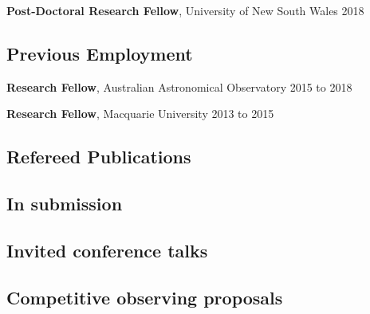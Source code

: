\documentclass[10pt]{article}
\newcommand{\cvlist}{}
\begin{document}
\textbf{Post-Doctoral Research Fellow},
            University of New South Wales
            \hfill {2018}

\vspace{0.1in}

\subsection*{Previous Employment}

\textbf{Research Fellow},
            Australian Astronomical Observatory
            \hfill {2015 to 2018}

\textbf{Research Fellow},
            Macquarie University
            \hfill {2013 to 2015}

\vspace{0.1in}

\subsection*{Refereed Publications}

\begin{list}{}{\cvlist}

\end{list}

\subsection*{In submission}
\begin{list}{}{\cvlist}

\end{list}

\subsection*{Invited conference talks}
\begin{list}{}{\cvlist}

\end{list}

\subsection*{Competitive observing proposals}
\end{document}
